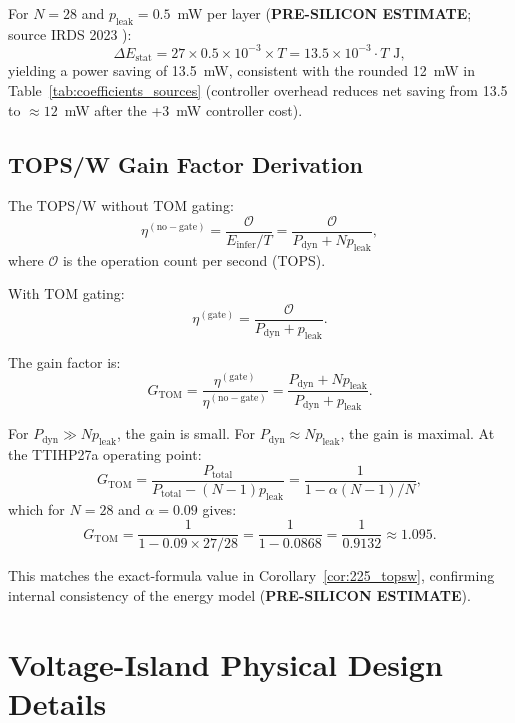 For \(N = 28\) and \(p_{\mathrm{leak}} = 0.5\)~mW per layer
(\textbf{PRE-SILICON ESTIMATE}; source IRDS 2023 \cite{irds2023}):
\[
  \Delta E_{\mathrm{stat}} = 27 \times 0.5 \times 10^{-3} \times T
  = 13.5 \times 10^{-3} \cdot T \text{ J},
\]
yielding a power saving of 13.5~mW, consistent with the rounded 12~mW
in Table~\ref{tab:coefficients_sources} (controller overhead reduces
net saving from 13.5 to \(\approx 12\)~mW after the +3~mW controller cost).

\subsection{TOPS/W Gain Factor Derivation}

The TOPS/W without TOM gating:
\begin{equation}
  \eta^{(\mathrm{no-gate})} = \frac{\mathcal{O}}{E_{\mathrm{infer}}/T}
  = \frac{\mathcal{O}}{P_{\mathrm{dyn}} + N p_{\mathrm{leak}}},
  \label{eq:eta_no_gate}
\end{equation}
where \(\mathcal{O}\) is the operation count per second (TOPS).

With TOM gating:
\begin{equation}
  \eta^{(\mathrm{gate})} = \frac{\mathcal{O}}{P_{\mathrm{dyn}} + p_{\mathrm{leak}}}.
  \label{eq:eta_gate}
\end{equation}

The gain factor is:
\begin{equation}
  G_{\mathrm{TOM}} = \frac{\eta^{(\mathrm{gate})}}{\eta^{(\mathrm{no-gate})}}
  = \frac{P_{\mathrm{dyn}} + N p_{\mathrm{leak}}}
         {P_{\mathrm{dyn}} + p_{\mathrm{leak}}}.
  \label{eq:gain_factor}
\end{equation}

For \(P_{\mathrm{dyn}} \gg N p_{\mathrm{leak}}\), the gain is small.  For
\(P_{\mathrm{dyn}} \approx N p_{\mathrm{leak}}\), the gain is maximal.
At the TTIHP27a operating point:
\[
  G_{\mathrm{TOM}} = \frac{P_{\mathrm{total}}}{P_{\mathrm{total}} - (N-1)p_{\mathrm{leak}}}
  = \frac{1}{1 - \alpha (N-1)/N},
\]
which for \(N = 28\) and \(\alpha = 0.09\) gives:
\[
  G_{\mathrm{TOM}} = \frac{1}{1 - 0.09 \times 27/28} = \frac{1}{1 - 0.0868}
  = \frac{1}{0.9132} \approx 1.095.
\]

This matches the exact-formula value in Corollary~\ref{cor:225_topsw},
confirming internal consistency of the energy model (\textbf{PRE-SILICON ESTIMATE}).

\section{Voltage-Island Physical Design Details}
\label{app:voltage_island}

